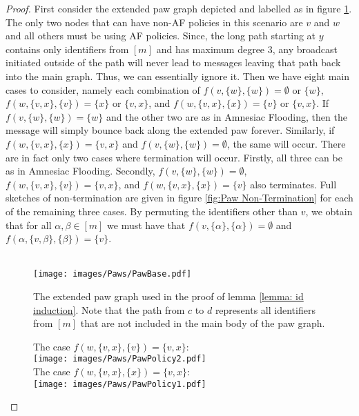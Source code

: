 \begin{proof}
    First consider the extended paw graph depicted and labelled as in figure \ref{fig:PawBase}. The only two nodes that can have non-AF policies in this scenario are $v$ and $w$ and all others must be using AF policies. Since, the long path starting at $y$ contains only identifiers from $[m]$ and has maximum degree $3$, any broadcast initiated outside of the path will never lead to messages leaving that path back into the main graph. Thus, we can essentially ignore it. Then we have eight main cases to consider, namely each combination of $f(v,\{w\},\{w\})=\emptyset$ or $\{w\}$, $f(w,\{v,x\},\{v\})=\{x\}$ or $\{v,x\}$, and $f(w,\{v,x\},\{x\})=\{v\}$ or $\{v,x\}$. If $f(v,\{w\},\{w\})=\{w\}$ and the other two are as in Amnesiac Flooding, then the message will simply bounce back along the extended paw forever. Similarly, if $f(w,\{v,x\},\{x\})=\{v,x\}$ and $f(v,\{w\},\{w\})=\emptyset$, the same will occur. 
    There are in fact only two cases where termination will occur. Firstly, all three can be as in Amnesiac Flooding. Secondly, $f(v,\{w\},\{w\})=\emptyset$, $f(w,\{v,x\},\{v\})=\{v,x\}$, and $f(w,\{v,x\},\{x\})=\{v\}$ also terminates. Full sketches of non-termination are given in figure \ref{fig:Paw Non-Termination} for each of the remaining three cases. By permuting the identifiers other than $v$, we obtain that for all $\alpha,\beta \in [m]$ we must have that $f(v,\{\alpha\},\{\alpha\})=\emptyset$ and $f(\alpha,\{v,\beta\},\{\beta\})=\{v\}$.\\ \\
    \begin{figure}
        \centering
        \texttt{[image: images/Paws/PawBase.pdf]}
        \caption{The extended paw graph used in the proof of lemma \ref{lemma: id induction}. Note that the path from $c$ to $d$ represents all identifiers from $[m]$ that are not included in the main body of the paw graph.}
        \label{fig:PawBase}
    \end{figure}
    \begin{figure}
        \centering
        The case $f(w,\{v,x\},\{v\})=\{v,x\}$:\\ \texttt{[image: images/Paws/PawPolicy2.pdf]}\\
        The case $f(w,\{v,x\},\{x\})=\{v,x\}$:\\ \texttt{[image: images/Paws/PawPolicy1.pdf]}\\
    \end{figure}
    \begin{figure}
    \ContinuedFloat

\end{figure}
\end{proof}
